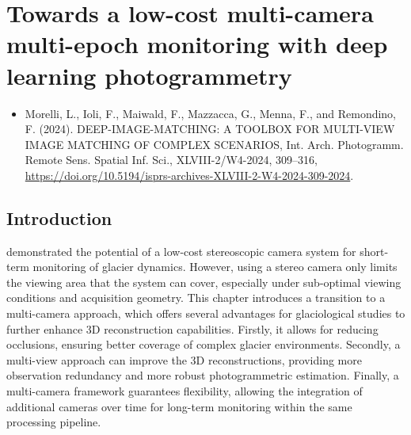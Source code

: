 \graphicspath{{figures/chapter5/}}
\onehalfspacing

\chapter{Towards a low-cost multi-camera multi-epoch monitoring with deep learning photogrammetry}\label{ch:5}

\vfill


\begin{itemize}
  \item Morelli, L., Ioli, F., Maiwald, F., Mazzacca, G., Menna, F., and Remondino, F. (2024). DEEP-IMAGE-MATCHING: A TOOLBOX FOR MULTI-VIEW IMAGE MATCHING OF COMPLEX SCENARIOS, Int. Arch. Photogramm. Remote Sens. Spatial Inf. Sci., XLVIII-2/W4-2024, 309–316, \url{https://doi.org/10.5194/isprs-archives-XLVIII-2-W4-2024-309-2024}. 
\end{itemize}

\newpage

\section{Introduction}\label{sec:5:intro}


 demonstrated the potential of a low-cost stereoscopic camera system for short-term monitoring of glacier dynamics. 
However, using a stereo camera only limits the viewing area that the system can cover, especially under sub-optimal viewing conditions and acquisition geometry.
This chapter introduces a transition to a multi-camera approach, which offers several advantages for glaciological studies to further enhance 3D reconstruction capabilities.  
Firstly, it allows for reducing occlusions, ensuring better coverage of complex glacier environments. 
Secondly, a multi-view approach can improve the 3D reconstructions, providing more observation redundancy and more robust photogrammetric estimation.
Finally, a multi-camera framework guarantees flexibility, allowing the integration of additional cameras over time for long-term monitoring within the same processing pipeline. 

